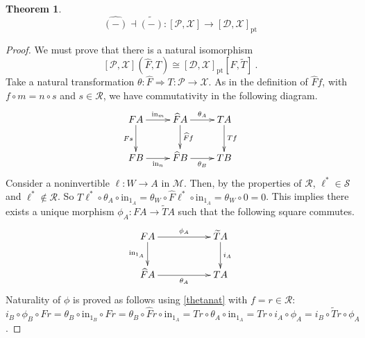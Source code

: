 \documentclass[a4paper,12pt,reqno]{amsart}
\newtheorem{theorem}{Theorem}[section] %
\theoremstyle{definition}
\theoremstyle{fact}
\theoremstyle{genquest}
\theoremstyle{step}
\newcommand{\lra}{\longrightarrow}
\newcommand{\ra}{\rightarrow}
\def\CD{{\mathscr D}}
\def\CM{{\mathscr M}}
\def\CP{{\mathscr P}}
\def\CR{{\mathscr R}}
\def\CS{{\mathscr S}}
\def\CX{{\mathscr X}}
\begin{document}
\begin{theorem}\label{adjthm}
\begin{equation*}
\widehat{(-)} \dashv \widetilde{(-)} : [\CP,\CX] \lra [\CD,\CX]_{\mathrm{pt}}
\end{equation*}
\end{theorem}
\begin{proof}
We must prove that there is a natural isomorphism
$$[\CP,\CX](\widehat{F}, T) \cong [\CD,\CX]_{\mathrm{pt}}[F,\widetilde{T}] \ .$$
Take a natural transformation $\theta : \widehat{F}\Rightarrow T :\CP \ra \CX$. 
As in the definition of $\widehat{F}f$, with $f\circ m = n \circ s$ and $s\in \CR$,
we have commutativity in the following diagram. 
\begin{equation}\label{thetanat}
\begin{aligned}
\xymatrix{
FA \ar[r]^-{\mathrm{in}_m} \ar[d]_-{Fs} & \widehat{F}A \ar[d]^-{\widehat{F}f} \ar[r]^-{\theta_A} & TA \ar[d]^-{Tf}\\
FB \ar[r]_-{\mathrm{in}_n} & \widehat{F}B \ar[r]_-{\theta_B} & TB}
\end{aligned}
\end{equation}
Consider a noninvertible $\ell : W \ra A$ in $\CM$. 
Then, by the properties of $\CR$, $\ell^* \in \CS$ and $\ell^* \notin \CR$.
So $T\ell^*\circ \theta_A \circ \mathrm{in}_{1_A} = \theta_W \circ \widehat{F}\ell^*\circ \mathrm{in}_{1_A} = \theta_W \circ 0 = 0$. This implies there exists a unique morphism $\phi_A : FA \lra \widetilde{T}A$ 
such that the following square commutes.
\begin{equation}\label{defphi}
\begin{aligned}
\xymatrix{
FA \ar[rr]^-{\phi_A} \ar[d]_-{\mathrm{in}_{1_A}} && \widetilde{T}A \ar[d]^-{i_A} \\
\widehat{F}A \ar[rr]_-{\theta_A} && TA}
\end{aligned}
\end{equation}
Naturality of $\phi$ is proved as follows using \eqref{thetanat} with $f=r \in \CR$:
$i_B\circ \phi_B\circ Fr = \theta_B \circ \mathrm{in}_{1_B} \circ Fr = \theta_B \circ \widehat{F}r \circ \mathrm{in}_{1_A} = Tr \circ \theta_A \circ \mathrm{in}_{1_A} = Tr \circ i_A \circ \phi_A = i_B\circ \widetilde{T}r\circ \phi_A $. 


\end{proof}
\end{document}
